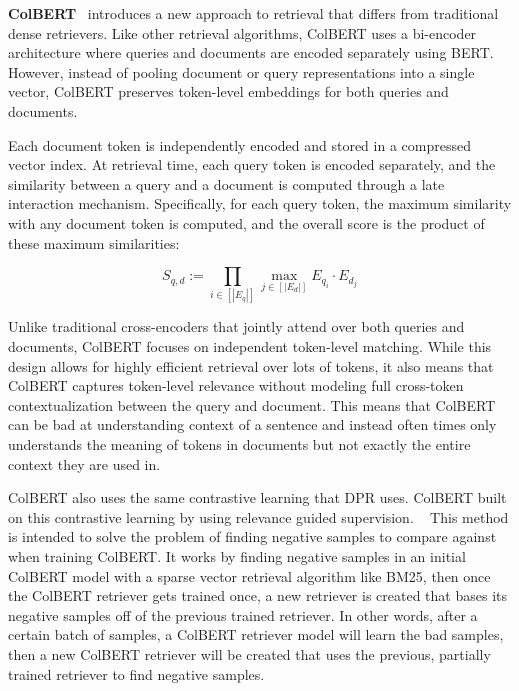 \documentclass[twocolumn, 10pt]{article}
\begin{document}
\textbf{ColBERT}~\cite{khattab2020colbert} introduces a new approach to retrieval that differs from traditional dense retrievers. Like other retrieval algorithms, ColBERT uses a bi-encoder architecture where queries and documents are encoded separately using BERT. However, instead of pooling document or query representations into a single vector, ColBERT preserves token-level embeddings for both queries and documents. 

Each document token is independently encoded and stored in a compressed vector index. At retrieval time, each query token is encoded separately, and the similarity between a query and a document is computed through a late interaction mechanism. Specifically, for each query token, the maximum similarity with any document token is computed, and the overall score is the product of these maximum similarities:

\begin{equation*}
S_{q,d} := \prod_{i \in [|E_q|]} \max_{j \in [|E_d|]} E_{q_i} \cdot E_{d_j}
\end{equation*}

Unlike traditional cross-encoders that jointly attend over both queries and documents, ColBERT focuses on independent token-level matching. While this design allows for highly efficient retrieval over lots of tokens, it also means that ColBERT captures token-level relevance without modeling full cross-token contextualization between the query and document.
This means that ColBERT can be bad at understanding context of a sentence and instead often times only understands the meaning of tokens in documents but not exactly the entire context they are used in.

ColBERT also uses the same contrastive learning that DPR uses. ColBERT built on this contrastive learning by using relevance guided supervision. ~\cite{khattab2021relevance} This method is intended to solve the problem of finding negative samples to compare against when training ColBERT.
It works by finding negative samples in an initial ColBERT model with a sparse vector retrieval algorithm like BM25, then once the ColBERT retriever gets trained once, a new retriever is created that bases its negative samples off of the previous trained retriever.
In other words, after a certain batch of samples, a ColBERT retriever model will learn the bad samples, then a new ColBERT retriever will be created that uses the previous, partially trained retriever to find negative samples.
\end{document}
